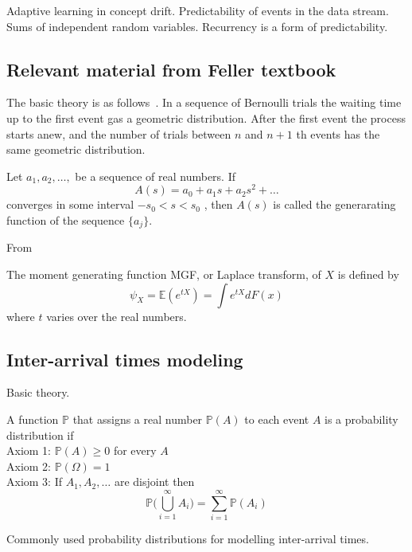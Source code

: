 Adaptive learning in concept drift.
Predictability of events in the data stream.
~\cite{feller2008introduction}
Sums of independent random variables.
Recurrency is a form of predictability.

\subsection{Relevant material from Feller textbook}

The basic theory is as follows~\cite{feller2008introduction}.
In a sequence of Bernoulli trials the waiting time up to the first event gas a geometric distribution.
After the first event the process starts anew, and the number of trials between $n$ and $n+1$ th events has the same geometric distribution.
\begin{definition}
	Let $a_1, a_2, \dots, $ be a sequence of real numbers. If 
	\begin{equation}
		A(s) = a_0 + a_1 s + a_2 s^2 + \dots 
	\end{equation}
    converges in some interval $-s_0 < s < s_0 $ , then $A(s)$ is called the generarating function of the sequence $\{a_j\}$. 
\end{definition}

From\cite{wasserman2013all}
\begin{definition}
	The moment generating function MGF, or Laplace transform, of $X$ is defined by
	\begin{equation}
		\psi_X = \mathbb{E}(e^{tX}) = \int e^{tX} dF(x) 
	\end{equation}
where $t$ varies over the real numbers.
\end{definition}

\subsection{Inter-arrival times modeling}

Basic theory.
\begin{definition}
	A function $\mathbb{P}$ that assigns a real number $\mathbb{P}(A)$ to each event $A$ is a probability distribution if \\
	Axiom 1: $\mathbb{P}(A) \geq 0$ for every $A$\\
	Axiom 2: $\mathbb{P}(\Omega) = 1$\\
	Axiom 3: If $A_1, A_2, \dots $ are disjoint then 
	\begin{equation}
		\mathbb{P} \Big( \bigcup\limits_{i=1}^{\infty} A_i  \Big) = \sum_{i=1}^{\infty} \mathbb{P}(A_i)
	\end{equation}
\end{definition}
Commonly used probability distributions for modelling inter-arrival times.


